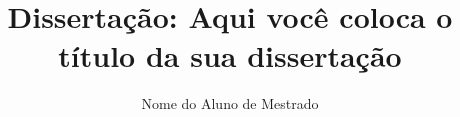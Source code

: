 \documentclass[bind,a4paper]{mythesis}
\title{Dissertação: Aqui você coloca o título da sua dissertação}
\author{Nome do Aluno de Mestrado}
\begin{document}



\begin{frontmatter}
	
\end{frontmatter}

\begin{mainmatter}
  
  
  
  
  
  
  
\end{mainmatter}

\begin{appendices}
\end{appendices}

\begin{backmatter}
	
\end{backmatter}

\end{document}
